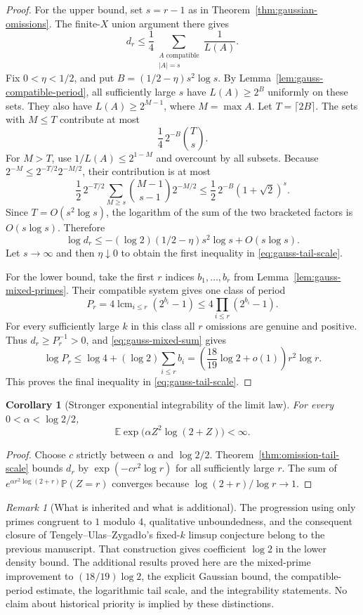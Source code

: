 \documentclass[11pt,a4paper]{article}
\newtheorem{corollary}[theorem]{Corollary}
\theoremstyle{definition}
\theoremstyle{remark}\newtheorem{remark}[theorem]{Remark}
\begin{document}
\begin{proof}
For the upper bound, set $s=r-1$ as in
Theorem~\ref{thm:gaussian-omissions}.  The finite-$X$ union argument
there gives
\[
 d_r\leq\frac14
 \sum_{\substack{A\text{ compatible}\\|A|=s}}\frac1{L(A)}.
\]
Fix $0<\eta<1/2$, and put
$B=(1/2-\eta)s^2\log s$.  By
Lemma~\ref{lem:gauss-compatible-period}, all sufficiently large $s$
have $L(A)\geq2^B$ uniformly on these sets.  They also have
$L(A)\geq2^{M-1}$, where $M=\max A$.  Let $T=\lceil2B\rceil$.
The sets with $M\leq T$ contribute at most
\[
 \frac14\,2^{-B}\binom{T}{s}.
\]
For $M>T$, use $1/L(A)\leq2^{1-M}$ and overcount by all subsets.
Because $2^{-M}\leq2^{-T/2}2^{-M/2}$, their contribution is at most
\[
 \frac12\,2^{-T/2}
 \sum_{M\geq s}\binom{M-1}{s-1}2^{-M/2}
 \leq\frac12\,2^{-B}(1+\sqrt2)^s.
\]
Since $T=O(s^2\log s)$, the logarithm of the sum of the two bracketed
factors is $O(s\log s)$.  Therefore
\[
 \log d_r\leq-(\log2)(1/2-\eta)s^2\log s+O(s\log s).
\]
Let $s\to\infty$ and then $\eta\downarrow0$ to obtain the first
inequality in \eqref{eq:gauss-tail-scale}.

For the lower bound, take the first $r$ indices $b_1,\ldots,b_r$
from Lemma~\ref{lem:gauss-mixed-primes}.  Their compatible system
gives one class of period
\[
 P_r=4\operatorname{lcm}_{i\leq r}(2^{b_i}-1)
 \leq4\prod_{i\leq r}(2^{b_i}-1).
\]
For every sufficiently large $k$ in this class all $r$ omissions are
genuine and positive.  Thus $d_r\geq P_r^{-1}>0$, and
\eqref{eq:gauss-mixed-sum} gives
\[
 \log P_r\leq\log4+(\log2)\sum_{i\leq r}b_i
 =\left(\frac{18}{19}\log2+o(1)\right)r^2\log r.
\]
This proves the final inequality in \eqref{eq:gauss-tail-scale}.
\end{proof}

\begin{corollary}[Stronger exponential integrability of the limit law]
For every $0<\alpha<\log2/2$,
\[
 \mathbb E\exp\bigl(\alpha Z^2\log(2+Z)\bigr)<\infty.
\]
\end{corollary}

\begin{proof}
Choose $c$ strictly between $\alpha$ and $\log2/2$.
Theorem~\ref{thm:omission-tail-scale} bounds $d_r$ by
$\exp(-c r^2\log r)$ for all sufficiently large $r$.
The sum of $e^{\alpha r^2\log(2+r)}\mathbb P(Z=r)$ converges because
$\log(2+r)/\log r\to1$.
\end{proof}

\begin{remark}[What is inherited and what is additional]
The progression using only primes congruent to $1$ modulo $4$,
qualitative unboundedness, and the consequent closure of
Tengely--Ulas--Zygad\l{}o's fixed-$k$ limsup conjecture belong to the
previous manuscript.  That construction gives coefficient $\log2$
in the lower density bound.  The additional results proved here are
the mixed-prime improvement to $(18/19)\log2$, the explicit Gaussian
bound, the compatible-period estimate, the logarithmic tail scale,
and the integrability statements.
No claim about historical priority is implied by these distinctions.
\end{remark}
\end{document}
